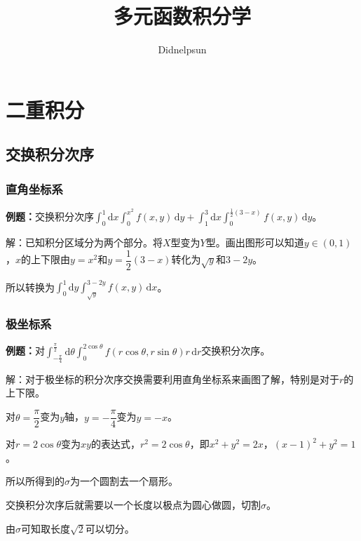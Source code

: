 \documentclass[UTF8, 12pt]{ctexart}
\author{Didnelpsun}
\title{多元函数积分学}
\date{}
\begin{document}
\maketitle
\pagestyle{empty}
\thispagestyle{empty}
\tableofcontents
\thispagestyle{empty}
\newpage
\pagestyle{plain}
\setcounter{page}{1}
\section{二重积分}

\subsection{交换积分次序}

\subsubsection{直角坐标系}

\textbf{例题：}交换积分次序$\int_0^1\textrm{d}x\int_0^{x^2}f(x,y)\,\textrm{d}y+\int_1^3\textrm{d}x\int_0^{\frac{1}{2}(3-x)}f(x,y)\,\textrm{d}y$。

解：已知积分区域分为两个部分。将$X$型变为$Y$型。画出图形可以知道$y\in(0,1)$，$x$的上下限由$y=x^2$和$y=\dfrac{1}{2}(3-x)$转化为$\sqrt{y}$和$3-2y$。

所以转换为$\int_0^1\textrm{d}y\int_{\sqrt{y}}^{3-2y}f(x,y)\,\textrm{d}x$。

\subsubsection{极坐标系}

\textbf{例题：}对$\int_{-\frac{\pi}{4}}^{\frac{\pi}{2}}\textrm{d}\theta\int_0^{2\cos\theta}f(r\cos\theta,r\sin\theta)r\,\textrm{d}r$交换积分次序。

解：对于极坐标的积分次序交换需要利用直角坐标系来画图了解，特别是对于$r$的上下限。

对$\theta=\dfrac{\pi}{2}$变为$y$轴，$y=-\dfrac{\pi}{4}$变为$y=-x$。

对$r=2\cos\theta$变为$xy$的表达式，$r^2=2\cos\theta$，即$x^2+y^2=2x$，$(x-1)^2+y^2=1$。

\begin{minipage}{0.625\linewidth}
    所以所得到的$\sigma$为一个圆割去一个扇形。
    
    交换积分次序后就需要以一个长度以极点为圆心做圆，切割$\sigma$。

    由$\sigma$可知取长度$\sqrt{2}$可以切分。
\end{minipage}
\hfill
\begin{minipage}{0.25\linewidth}
\end{minipage}
\end{document}

